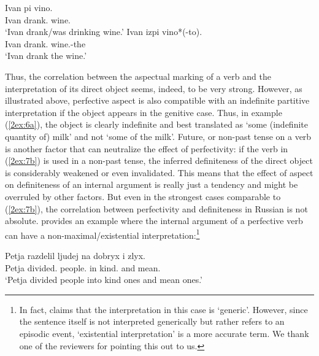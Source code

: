 \documentclass[output=paper]{langsci/langscibook}
\begin{document}
\begin{exe}
\ex\label{2ex:8}
	\begin{xlista}
	\ex\label{2ex:8a}
	\gll	Ivan 	pi 			vino. \\
		Ivan 	drank.{} 	wine.{} 	\\
	\glt	`Ivan drank/was drinking wine.'
	\ex\label{2ex:8b}
	\gll 	Ivan 	izpi 			vino*(-to).\\
		Ivan 	drank.{} 	wine.{}-the\\
	\glt	`Ivan drank the wine.'
	\end{xlista}
\end{exe}

Thus, the correlation between the aspectual marking of a verb and the interpretation of its direct object seems, indeed, to be very strong. However, as illustrated above, perfective aspect is also compatible with an indefinite partitive interpretation if the object appears in the genitive case. Thus, in example (\ref{2ex:6a}), the object is clearly indefinite and best translated as `some (indefinite quantity of) milk' and not `some of the milk'. Future, or non-past \citep[][]{borik:06} tense on a verb is another factor that can neutralize the effect of perfectivity:  if the verb in (\ref{2ex:7b}) is used in a non-past tense, the inferred definiteness of the direct object is considerably weakened or even invalidated. This means that the effect of aspect on definiteness of an internal argument is really just a tendency and might be overruled by other factors. But even in the strongest cases comparable to (\ref{2ex:7b}), the correlation between perfectivity  and definiteness in Russian is not absolute. \cite[][92]{borik:06} provides an example where the internal argument of a perfective verb can have a non-maximal/existential interpretation:\footnote{{In fact, \cite{borik:06}  claims that the interpretation in this case is `generic'. However, since the sentence itself is not interpreted generically but rather refers to an episodic event, `existential interpretation' is a more accurate term. We thank one of the reviewers for pointing this out to us.}}

\begin{exe}
\ex\label{2ex:9}
\gll	Petja 	razdelil 			ljudej 			na 	dobryx 		i 	zlyx. \\
	Petja 	divided.{} 	people.{} 	in 	kind.{} 	and 	mean.{} \\
\glt	`Petja divided people into kind ones and mean ones.'
\end{exe}
\end{document}
